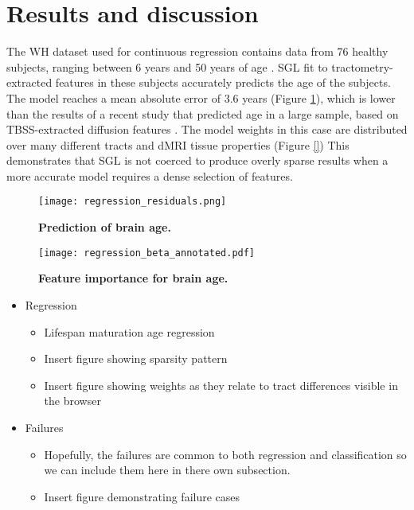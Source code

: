 \section*{Results and discussion}

The WH dataset used for continuous regression contains data from 76 healthy
subjects, ranging between 6 years and 50 years of age
\cite{yeatman2014lifespan}. SGL fit to tractometry-extracted features in these
subjects accurately predicts the age of the subjects. The model reaches a mean
absolute error of 3.6 years (Figure \ref{fig:regress-results}), which is lower
than the results of a recent study that predicted age in a large sample, based
on TBSS-extracted diffusion features \cite{Richard2018-ux}. The model weights
in this case are distributed over many different tracts and dMRI tissue
properties (Figure \ref{}) This demonstrates that SGL is not coerced to produce overly sparse
results when a more accurate model requires a dense selection of features.


\begin{figure}[!h]
    \centering
    \texttt{[image: regression\_residuals.png]}
    \caption{{\bf Prediction of brain age.}
    }
    \label{fig:regress-results}
\end{figure}

\begin{figure}[!h]
    \centering
    \texttt{[image: regression\_beta\_annotated.pdf]}
    \caption{{\bf Feature importance for brain age.}
    }
    \label{fig:regress-beta}
\end{figure}

\begin{itemize}
  \item Regression
    \begin{itemize}
      \item Lifespan maturation age regression
      \item Insert figure showing sparsity pattern
      \item Insert figure showing weights as they relate to tract differences visible in the browser
    \end{itemize}
\end{itemize}
\begin{itemize}
  \item Failures
    \begin{itemize}
      \item Hopefully, the failures are common to both regression
        and classification so we can include them here in there own
        subsection.
      \item Insert figure demonstrating failure cases
    \end{itemize}
\end{itemize}




